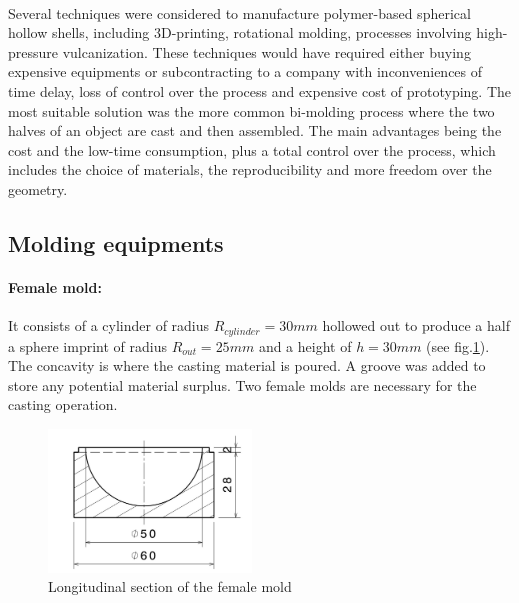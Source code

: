\paragraph{}
Several techniques were considered to manufacture polymer-based spherical hollow shells, including 3D-printing, rotational molding, processes involving high-pressure vulcanization. These techniques would have required either buying expensive equipments or subcontracting to a company with inconveniences of time delay, loss of control over the process and expensive cost of prototyping. 
The most suitable solution was the more common bi-molding process where the two halves of an object are cast and then assembled. The main advantages being the cost and the low-time consumption, plus a total control over the process, which includes the choice of materials, the reproducibility and more freedom over the geometry.
\subsection{Molding equipments}

\paragraph{Female mold:}
It consists of a cylinder of radius $R_{cylinder}=30 mm$  hollowed out to produce a half a sphere imprint of radius $R_{out}=25 mm$ and a height of $h = 30 mm$ (see fig.\ref{fig:female_mold}). The concavity is where the casting material is poured.
A groove was added to store any potential material surplus. Two female molds are necessary for the casting operation.
\begin{figure}[H] %
	\centering%
		\includegraphics[width=0.48\textwidth]{figures/Chapter_1/female_mold.jpg}%
		\caption{Longitudinal section of the female mold}%
		\label{fig:female_mold}%
\end{figure}


